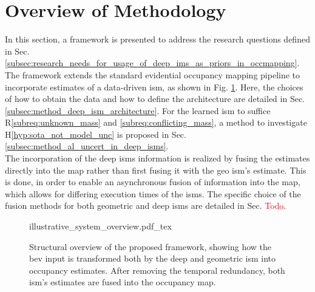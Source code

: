 \section{Overview of Methodology}
\label{sec:framework_overview}
In this section, a framework is presented to address the research questions defined in Sec. \ref{subsec:research_needs_for_usage_of_deep_ims_as_priors_in_occmapping}. The framework extends the standard evidential occupancy mapping pipeline \cite{pagac1996evidential} to incorporate estimates of a data-driven \gls{ism}, as shown in Fig. \ref{fig:illustrative_system_overview}. Here, the choices of how to obtain the data and how to define the architecture are detailed in Sec. \ref{subsec:method_deep_ism_architecture}. For the learned \gls{ism} to suffice R\ref{subreq:unknown_mass} and \ref{subreq:conflicting_mass}, a method to investigate H\ref{hyp:sota_not_model_unc} is proposed in Sec. \ref{subsec:method_al_uncert_in_deep_isms}.\\
The incorporation of the deep \gls{ism}s information is realized by fusing the estimates directly into the map rather than first fusing it with the geo \gls{ism}'s estimate. This is done, in order to enable an asynchronous fusion of information into the map, which allows for differing execution times of the \gls{ism}s. The specific choice of the fusion methods for both geometric and deep \gls{ism}s are detailed in Sec. \textcolor{red}{Todo}.
\begin{figure}[H]
	\begin{center}
		{illustrative_system_overview.pdf_tex}
		\caption{\label{fig:illustrative_system_overview}Structural overview of the proposed framework, showing how the \gls{bev} input is transformed both by the deep and geometric \gls{ism} into occupancy estimates. After removing the temporal redundancy, both \gls{ism}'s estimates are fused into the occupancy map.}
	\end{center}
\end{figure} 
%

